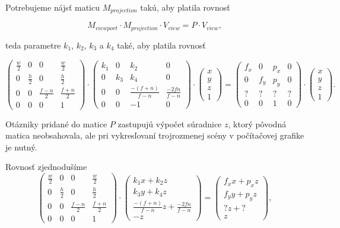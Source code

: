 Potrebujeme nájsť maticu $M_{projection}$ takú, aby platila rovnosť

$$M_{viewport} \cdot M_{projection} \cdot V_{view} = P \cdot V_{view} \mathrm{,}$$

teda parametre $k_1$, $k_2$, $k_3$ a $k_4$ také, aby platila rovnosť

$$
\begin{pmatrix}
\frac{w}{2} & 0 & 0 & \frac{w}{2} \\
0 & \frac{h}{2} & 0 & \frac{h}{2} \\
0 & 0 & \frac{f-n}{2} & \frac{f+n}{2} \\
0 & 0 & 0 & 1
\end{pmatrix}
\cdot
\begin{pmatrix}
k_1 & 0 & k_2 & 0 \\
0 & k_3 & k_4 & 0 \\
0 & 0 & \frac{-(f+n)}{f-n} & \frac{-2fn}{f-n} \\
0 & 0 & -1 & 0
\end{pmatrix}
\cdot
\begin{pmatrix}
x \\
y \\
z \\
1
\end{pmatrix}
=
\begin{pmatrix}
f_x & 0 & p_x & 0 \\
0 & f_y & p_y & 0 \\
? & ? & ? & ? \\
0 & 0 &  1  & 0
\end{pmatrix}
\cdot
\begin{pmatrix}
x \\
y \\
z \\
1
\end{pmatrix} \mathrm{.}
$$

Otázniky pridané do matice $P$ zastupujú výpočet súradnice $z$, ktorý pôvodná matica neobsahovala, ale pri vykresľovaní trojrozmenej scény v počítačovej grafike je nutný.

Rovnosť zjednodušíme
$$
\begin{pmatrix}
\frac{w}{2} & 0 & 0 & \frac{w}{2} \\
0 & \frac{h}{2} & 0 & \frac{h}{2} \\
0 & 0 & \frac{f-n}{2} & \frac{f+n}{2} \\
0 & 0 & 0 & 1
\end{pmatrix}
\cdot
\begin{pmatrix}
k_1 x + k_2 z \\
k_3 y + k_4 z \\
\frac{-(f+n)}{f-n} z + \frac{-2fn}{f-n} \\
-z
\end{pmatrix}
=
\begin{pmatrix}
f_x x + p_x z \\
f_y y + p_y z \\
? z + ? \\
z
\end{pmatrix} \mathrm{,}
$$

